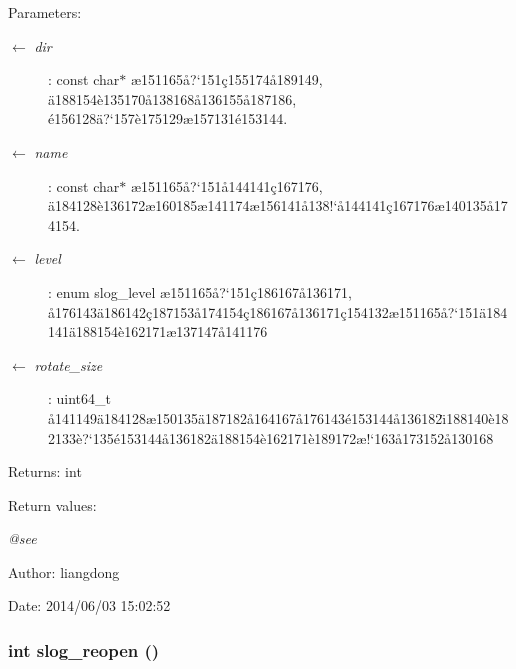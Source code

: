 \begin{Desc}
\item[Parameters:]
\begin{description}
\item[\mbox{$\leftarrow$} {\em dir}]: const char$\ast$ \ae{}151165\aa{}?`151\c{c}155174\aa{}189149, \"{a}188154\`{e}135170\aa{}138168\aa{}136155\aa{}187186, \'{e}156128\"{a}?`157\`{e}175129\ae{}157131\'{e}153144. \item[\mbox{$\leftarrow$} {\em name}]: const char$\ast$ \ae{}151165\aa{}?`151\aa{}144141\c{c}167176, \"{a}184128\`{e}136172\ae{}160185\ae{}141174\ae{}156141\aa{}138!`\aa{}144141\c{c}167176\ae{}140135\aa{}174154. \item[\mbox{$\leftarrow$} {\em level}]: enum slog\_\-level \ae{}151165\aa{}?`151\c{c}186167\aa{}136171, \aa{}176143\"{a}186142\c{c}187153\aa{}174154\c{c}186167\aa{}136171\c{c}154132\ae{}151165\aa{}?`151\"{a}184141\"{a}188154\`{e}162171\ae{}137147\aa{}141176 \item[\mbox{$\leftarrow$} {\em rotate\_\-size}]: uint64\_\-t \aa{}141149\"{a}184128\ae{}150135\"{a}187182\aa{}164167\aa{}176143\'{e}153144\aa{}136182\"{\i}188140\`{e}182133\`{e}?`135\'{e}153144\aa{}136182\"{a}188154\`{e}162171\`{e}189172\ae{}!`163\aa{}173152\aa{}130168 \end{description}
\end{Desc}
\begin{Desc}
\item[Returns:]int \end{Desc}
\begin{Desc}
\item[Return values:]
\begin{description}
\item[{\em @see}]\end{description}
\end{Desc}
\begin{Desc}
\item[Author:]liangdong \end{Desc}
\begin{Desc}
\item[Date:]2014/06/03 15:02:52 \end{Desc}
\subsubsection{\setlength{\rightskip}{0pt plus 5cm}int slog\_\-reopen ()}\label{slog_8h_a9}


